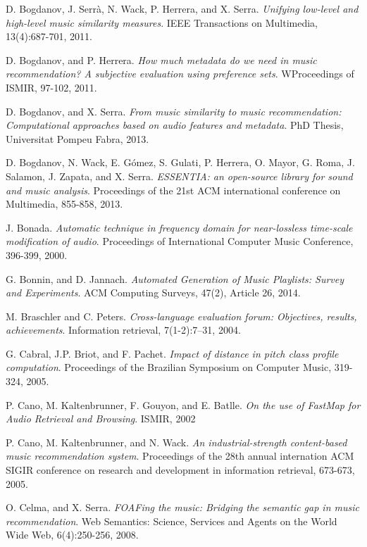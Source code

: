 \documentclass[11pt, oneside, openright]{Thesis} %
\begin{document}
\begin{thebibliography}{99}
D. Bogdanov, J. Serrà, N. Wack, P. Herrera, and X. Serra. 
\textit{Unifying low-level and high-level music similarity measures}.
IEEE Transactions on Multimedia, 13(4):687-701, 2011.

D. Bogdanov, and P. Herrera.
\textit{How much metadata do we need in music recommendation? A subjective evaluation using preference sets}.
WProceedings of ISMIR, 97-102, 2011.

D. Bogdanov, and X. Serra.
\textit{From music similarity to music recommendation: Computational approaches based on audio features and metadata}.
PhD Thesis, Universitat Pompeu Fabra, 2013.

D. Bogdanov, N. Wack, E. Gómez, S. Gulati, P. Herrera, O. Mayor, G. Roma, J. Salamon, J. Zapata, and X. Serra.
\textit{ESSENTIA: an open-source library for sound and music analysis}.
Proceedings of the 21st ACM international conference on Multimedia, 855-858, 2013.

J. Bonada.
\textit{Automatic technique in frequency domain for near-lossless time-scale modification of audio}.
Proceedings of International Computer Music Conference, 396-399, 2000.

G. Bonnin, and D. Jannach.
\textit{Automated Generation of Music Playlists: Survey and Experiments}.
ACM Computing Surveys, 47(2), Article 26, 2014.

M. Braschler and C. Peters. 
\textit{Cross-language evaluation forum: Objectives, results, achievements}. 
Information retrieval, 7(1-2):7–31, 2004.

G. Cabral, J.P. Briot, and F. Pachet. 
\textit{Impact of distance in pitch class profile computation}.
Proceedings of the Brazilian Symposium on Computer Music, 319-324, 2005.

P. Cano, M. Kaltenbrunner, F. Gouyon, and E. Batlle.
\textit{On the use of FastMap for Audio Retrieval and Browsing}.
ISMIR, 2002

P. Cano, M. Kaltenbrunner, and N. Wack.
\textit{An industrial-strength content-based music recommendation system}.
Proceedings of the 28th annual internation ACM SIGIR conference on research and development in information retrieval, 673-673, 2005.

O. Celma, and X. Serra.
\textit{FOAFing the music: Bridging the semantic gap in music recommendation}.
Web Semantics: Science, Services and Agents on the World Wide Web, 6(4):250-256, 2008.


\end{thebibliography}
\end{document}

